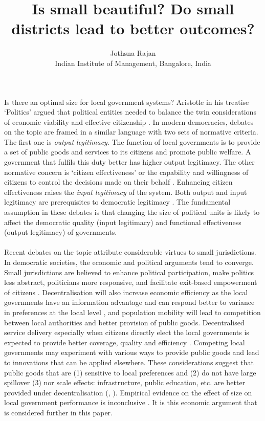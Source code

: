 \documentclass[12pt, a4paper]{article}
\title{Is small beautiful? Do small districts lead to better outcomes?}
\author{Jothsna Rajan \\
	\small{Indian Institute of Management, Bangalore, India}}
\begin{document}
	\maketitle
\paragraph{} Is there an optimal size for local government systems? Aristotle in his treatise `Politics' argued that political entities needed to balance the twin considerations of economic viability and effective citizenship \parencite{aristotle_politics_1984}. In modern democracies, debates on the topic are framed in a similar language with two sets of normative criteria. The first one is \textit{output legitimacy}. The function of local governments is to provide a set of public goods and services to its citizens and promote public welfare. A government that fulfils this duty better has higher output legitimacy. The other normative concern is `citizen effectiveness' or the capability and willingness of citizens to control the decisions made on their behalf \parencite{dahl_size_1973}. Enhancing citizen effectiveness raises the \textit{input legitimacy} of the system. Both output and input legitimacy are prerequisites to democratic legitimacy \parencite{scharpf_governing_1999}. The fundamental assumption in these debates is that changing the size of political units is likely to affect the democratic quality (input legitimacy) and functional effectiveness (output legitimacy) of governments.
\paragraph{} Recent debates on the topic attribute considerable virtues to small jurisdictions. In democratic societies, the economic and political arguments tend to converge. Small jurisdictions are believed to enhance political participation, make politics less abstract, politicians more responsive, and facilitate exit-based empowerment of citizens \parencite{hansen_size_2014}. Decentralisation will also increase economic efficiency as the local governments have an information advantage and can respond better to variance in preferences at the local level \parencite{oates_fiscal_1972}, and population mobility will lead to competition between local authorities and better provision of public goods. Decentralised service delivery especially when citizens directly elect the local governments is expected to provide better coverage, quality and efficiency \parencite{smoke2015rethinking}. Competing local governments may experiment with various ways to provide public goods and lead to innovations that can be applied elsewhere. These considerations suggest that public goods that are (1) sensitive to local preferences and (2) do not have large spillover (3) nor scale effects: infrastructure, public education, etc. are better provided under decentralisation (\cite{tiebout_economies_1960}, \cite{oates_fiscal_1972}). Empirical evidence on the effect of size on local government performance is inconclusive  \parencite{holzer2009literature}. It is this economic argument that is considered further in this paper.
\end{document}
